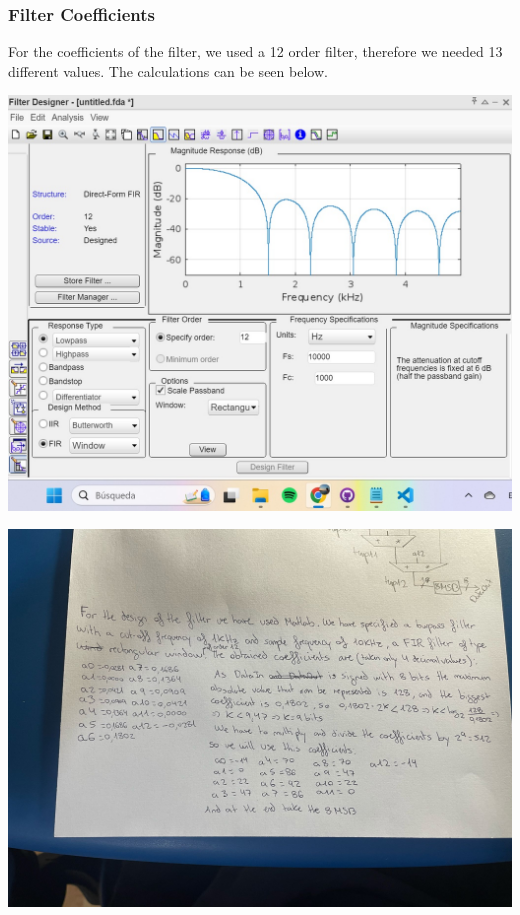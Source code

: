 \documentclass[a4paper, 12pt]{article}
\begin{document}
\subsubsection{Filter Coefficients}
\label{sec:org913ebc1}

For the coefficients of the filter, we used a 12 order filter, therefore we needed 13 different values. The calculations can be seen below.

\begin{center}
\includegraphics[width=.9\linewidth]{./img/filter_coefficient_matlab.jpg}
\end{center}

\begin{center}
\includegraphics[width=.9\linewidth]{./img/filter_coefficient_calculations.jpg}
\end{center}
\end{document}
